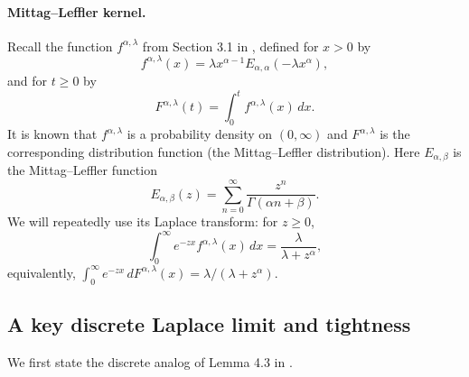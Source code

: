 \documentclass[letterpaper]{article}
\numberwithin{equation}{section}
\theoremstyle{definition}
\theoremstyle{remark}
\begin{document}
\paragraph{Mittag--Leffler kernel.}
Recall the function $f^{\alpha,\lambda}$ from Section 3.1 in \cite{jaisson2016rough}, defined for {$x>0$} by
\begin{equation}\label{eq:expressionoff}
  f^{\alpha,\lambda}(x)=\lambda x^{\alpha-1}E_{\alpha,\alpha}(-\lambda x^\alpha),
\end{equation}
and for {$t\ge0$} by
\begin{equation}\label{eq:Falphalambda}
  F^{\alpha,\lambda}(t)=\int_0^t f^{\alpha,\lambda}(x)\,dx.
\end{equation}
{It is known that $f^{\alpha,\lambda}$ is a probability density on $(0,\infty)$ and $F^{\alpha,\lambda}$ is the corresponding distribution function (the Mittag--Leffler distribution).}
Here $E_{\alpha,\beta}$ is the Mittag--Leffler function
\[
  E_{\alpha,\beta}(z)=\sum_{n=0}^\infty \frac{z^n}{\Gamma(\alpha n+\beta)}.
\]
{We will repeatedly use its Laplace transform: for $z\ge 0$,}
{\begin{equation}\label{eq:laplace_mittagleffler}
  \int_0^\infty e^{-zx} f^{\alpha,\lambda}(x)\,dx = \frac{\lambda}{\lambda+z^\alpha},
\end{equation}}
{equivalently, $\int_0^\infty e^{-zx}\,dF^{\alpha,\lambda}(x)=\lambda/(\lambda+z^\alpha)$.}

\subsection{A key discrete Laplace limit and tightness}

We first state the discrete analog of Lemma 4.3 in \cite{jaisson2016rough}.
\end{document}
